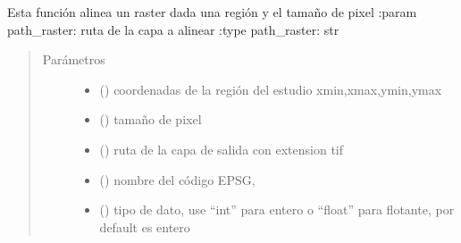 \documentclass[letterpaper,10pt,spanish]{sphinxmanual}
\begin{document}
\begin{fulllineitems}
\label{\detokenize{apcsig:apcsig.alinear_raster}}
Esta función alinea un raster dada una región y el tamaño de pixel 
:param path\_raster: ruta de la capa a alinear
:type path\_raster: str
\begin{quote}\begin{description}
\item[{Parámetros}] \leavevmode\begin{itemize}
\item {} 
 () \textendash{} coordenadas de la región del estudio  xmin,xmax,ymin,ymax

\item {} 
 () \textendash{} tamaño de pixel

\item {} 
 () \textendash{} ruta de la capa de salida con extension tif

\item {} 
 () \textendash{} nombre del código EPSG,

\item {} 
 () \textendash{} tipo de dato, use “int” para entero o “float” para flotante, por default es entero

\end{itemize}

\end{description}\end{quote}

\end{fulllineitems}
\end{document}
